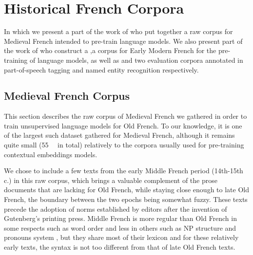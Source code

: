 \chapter{Historical French Corpora}

\begin{center}
    \begin{minipage}{0.66\textwidth}
        \begin{small}
            In which we present a part of the work of \citet{grobol-etal-2022-bertrade} who put together a raw corpus for Medieval French intended to pre-train language models. We also present part of the work of \citet{gabay-etal-2022-from} who construct a \freemmax,a corpus for Early Modern French for the pre-training of language models, as well as \freemlpm and \freemner two evaluation corpora annotated in part-of-speech tagging and named entity recognition respectively.
        \end{small}
    \end{minipage}
    \vspace{0.5cm}
\end{center}



\section{Medieval French Corpus}
\label{sec-data}

This section describes the raw corpus of Medieval French we gathered in order to train unsupervised language models for Old French. To our knowledge, it is one of the largest such dataset gathered for Medieval French, although it remains quite small (\SI{55}{\mebi\byte} in total) relatively to the corpora usually used for pre-training contextual embeddings models.

We chose to include a few texts from the early Middle French period (14th-15th c.) in this raw corpus, which brings a valuable complement of the prose documents that are lacking for Old French, while staying close enough to late Old French, the boundary between the two epochs being somewhat fuzzy. These texts precede the adoption of norms established by editors after the invention of Gutenberg's printing press. Middle French is more regular than Old French in some respects such as word order \citep{marchello-Nizia-etal-2020-grande} and less in others such as NP structure and pronouns system \citep{marchello-nizia-etal-1979-histoire}, but they share most of their lexicon and for these relatively early texts, the syntax is not too different from that of late Old French texts.

